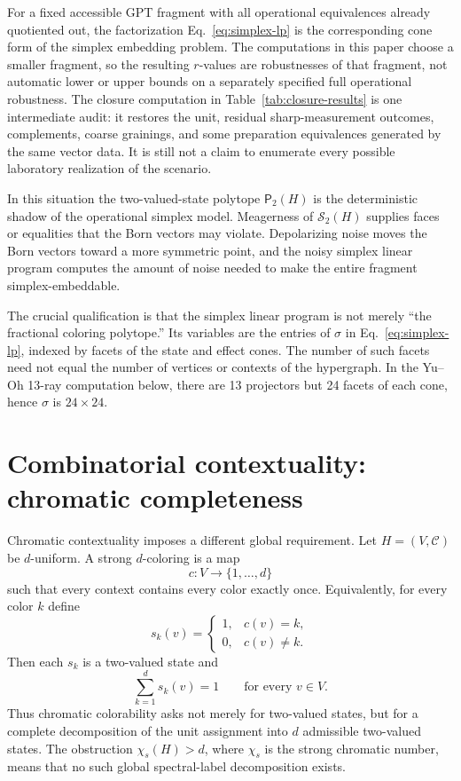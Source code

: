 \documentclass[aps,pra,twocolumn,superscriptaddress,nofootinbib]{revtex4-2}
\newcommand{\C}{\mathcal{C}}
\newcommand{\TVS}{\mathcal{S}_2}
\newcommand{\Ptwo}{\mathsf{P}_{2}}
\begin{document}
For a fixed accessible GPT fragment with all operational equivalences already
quotient\-ed out, the factorization Eq.~\eqref{eq:simplex-lp} is the
corresponding cone form of the simplex embedding problem.  The computations in
this paper choose a smaller fragment, so the resulting \(r\)-values are
robustnesses of that fragment, not automatic lower or upper bounds on a
separately specified full operational robustness.  The closure computation in
Table~\ref{tab:closure-results} is one intermediate audit: it restores the unit,
residual sharp-measurement outcomes, complements, coarse grainings, and some
preparation equivalences generated by the same vector data.  It is still not a
claim to enumerate every possible laboratory realization of the scenario.


In this situation the two-valued-state polytope $\Ptwo(H)$ is the deterministic shadow of the operational simplex model.  Meagerness of $\TVS(H)$ supplies faces or equalities that the Born vectors may violate.  Depolarizing noise moves the Born vectors toward a more symmetric point, and the noisy simplex linear program computes the amount of noise needed to make the entire fragment simplex-embeddable.

The crucial qualification is that the simplex linear program is not merely ``the fractional coloring polytope.''  Its variables are the entries of $\sigma$ in Eq.~\eqref{eq:simplex-lp}, indexed by facets of the state and effect cones.  The number of such facets need not equal the number of vertices or contexts of the hypergraph.  In the Yu--Oh 13-ray computation below, there are 13 projectors but 24 facets of each cone, hence $\sigma$ is $24\times 24$.

\section{Combinatorial contextuality: chromatic completeness}

Chromatic contextuality imposes a different global requirement.  Let $H=(V,\C)$ be $d$-uniform.  A strong $d$-coloring is a map
\begin{equation}
        c:V\to\{1,\ldots,d\}
\end{equation}
such that every context contains every color exactly once.  Equivalently, for every color $k$ define
\begin{equation}
        s_k(v)=\begin{cases}
        1, & c(v)=k,\\
        0, & c(v)\ne k.
        \end{cases}
\end{equation}
Then each $s_k$ is a two-valued state and
\begin{equation}
        \sum_{k=1}^d s_k(v)=1
        \qquad \text{for every }v\in V.
        \label{eq:color-decomp}
\end{equation}
Thus chromatic colorability asks not merely for two-valued states, but for a complete decomposition of the unit assignment into $d$ admissible two-valued states.  The obstruction $\chi_s(H)>d$, where $\chi_s$ is the strong chromatic number, means that no such global spectral-label decomposition exists.
\end{document}
